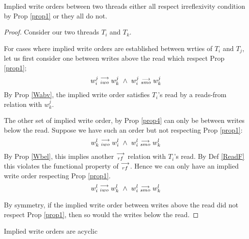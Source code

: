    \begin{property}
        \label{prop5}
        Implied write orders between two threads either all respect irreflexivity condition by Prop \ref{prop1} or they all do not.  
    \end{property}

    \begin{proof}
        
        Consider our two threads $T_i$ and $T_k$. 

        For cases where implied write orders are established between wrties of $T_i$ and $T_j$, let us first consider one between writes above the read which respect Prop \ref{prop1}; 
        \begin{align*}
            w_i^j\stackrel{\longrightarrow}{_{iwo}}w_k^j \ \wedge \ w_i^j\stackrel{\longrightarrow}{_{smo}}w_k^j
        \end{align*}
        By Prop \ref{Wabv}, the implied write order satisfies $T_i$'s read by a reads-from relation with $w_k^j$. 

        The other set of implied write order, by Prop \ref{prop4} can only be between writes below the read. Suppose we have such an order but not respecting Prop \ref{prop1}:
        \begin{align*}
            w_k^l\stackrel{\longrightarrow}{_{iwo}}w_i^l \ \wedge \ w_i^l\stackrel{\longrightarrow}{_{smo}}w_k^l
        \end{align*}
        By Prop \ref{Wbel}, this implies another $\stackrel{\longrightarrow}{_{rf}}$ relation with $T_i$'s read. By Def \ref{ReadF} this violates the functional property of $\stackrel{\longrightarrow}{_{rf}}$. Hence we can only have an implied write order respecting Prop \ref{prop1}.
        \begin{align*}
            w_i^l\stackrel{\longrightarrow}{_{iwo}}w_k^l \ \wedge \ w_i^l\stackrel{\longrightarrow}{_{smo}}w_k^l
        \end{align*}

        By symmetry, if the implied write order between writes above the read did not respect Prop \ref{prop1}, then so would the writes below the read.  
    \end{proof}

        
    \begin{property}
        \label{prop6}
        Implied write orders are acyclic
    \end{property}

